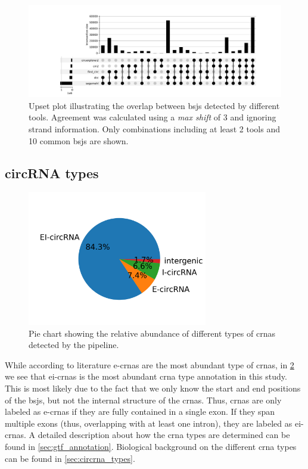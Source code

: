 \begin{figure}[H]
    \centering

    \includegraphics[width=\textwidth]{chapters/4_results_and_discussion/figures/detection/upset/shift_3_unstranded.png}
    \caption{Upset plot illustrating the overlap between \glspl{bsj} detected
        by
        different tools.
        Agreement was calculated using a \textit{max shift} of 3 and ignoring strand
        information.
        Only combinations including at least 2 tools and 10 common \glspl{bsj} are
        shown.
    }
    \label{fig:detection_upset_3_nostrand}
\end{figure}

\subsection{circRNA types}

\begin{figure}[H]
    \centering

    \includegraphics[width=0.7\textwidth]{chapters/4_results_and_discussion/figures/detection/types.png}
    \caption{Pie chart showing the relative abundance of different types of
        \glspl{crna} detected by the pipeline.
    }
    \label{fig:circrna_types}
\end{figure}

While according to literature \glspl{e-crna} are the most abundant type of
\glspl{crna}, in \cref{fig:circrna_types} we see that \glspl{ei-crna} is the
most abundant \gls{crna} type annotation in this study.
This is most likely due to the fact that we only know the start and end
positions of the \glspl{bsj}, but not the internal structure of the
\glspl{crna}.
Thus, \glspl{crna} are only labeled as \glspl{e-crna} if they are fully
contained in a single exon.
If they span multiple exons (thus, overlapping with at least one intron), they
are labeled as \glspl{ei-crna}.
A detailed description about how the \gls{crna} types are determined can be
found in \cref{sec:gtf_annotation}.
Biological background on the different \gls{crna} types can be found in
\cref{sec:circrna_types}.

